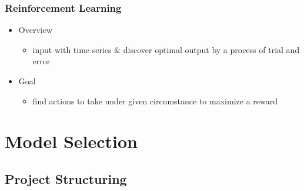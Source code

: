 \subsubsection{Reinforcement Learning}
\begin{itemize}
\item Overview
	\begin{itemize}
	\item input with time series \& discover optimal output by a process of trial and error
	\end{itemize}
\item Goal
	\begin{itemize}
	\item find actions to take under given circumstance to maximize a reward
	\end{itemize}
\end{itemize}

%


\section{Model Selection}

\subsection{Project Structuring}


